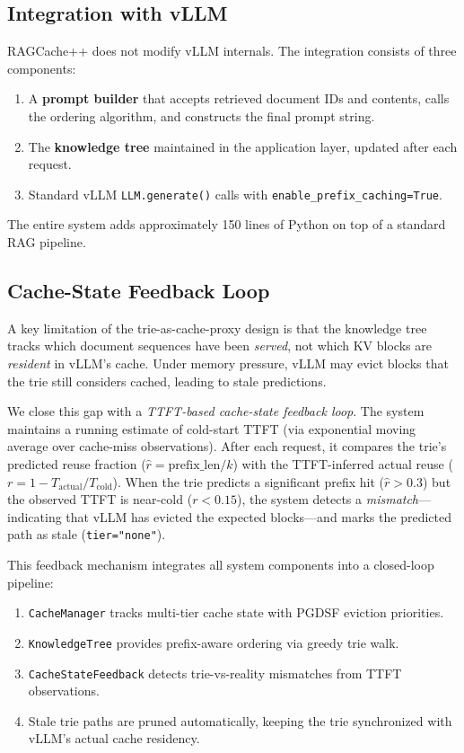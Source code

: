 \documentclass{article}
\begin{document}
\subsection{Integration with vLLM}

RAGCache++ does not modify vLLM internals. The integration consists of three components:
\begin{enumerate}
\item A \textbf{prompt builder} that accepts retrieved document IDs and contents, calls the ordering algorithm, and constructs the final prompt string.
\item The \textbf{knowledge tree} maintained in the application layer, updated after each request.
\item Standard vLLM \texttt{LLM.generate()} calls with \texttt{enable\_prefix\_caching=True}.
\end{enumerate}
The entire system adds approximately 150 lines of Python on top of a standard RAG pipeline.

\subsection{Cache-State Feedback Loop}
\label{sec:feedback}

A key limitation of the trie-as-cache-proxy design is that the knowledge tree tracks which document sequences have been \emph{served}, not which KV blocks are \emph{resident} in vLLM's cache. Under memory pressure, vLLM may evict blocks that the trie still considers cached, leading to stale predictions.

We close this gap with a \emph{TTFT-based cache-state feedback loop}. The system maintains a running estimate of cold-start TTFT (via exponential moving average over cache-miss observations). After each request, it compares the trie's predicted reuse fraction ($\hat{r} = \text{prefix\_len} / k$) with the TTFT-inferred actual reuse ($r = 1 - T_{\text{actual}} / T_{\text{cold}}$). When the trie predicts a significant prefix hit ($\hat{r} > 0.3$) but the observed TTFT is near-cold ($r < 0.15$), the system detects a \emph{mismatch}---indicating that vLLM has evicted the expected blocks---and marks the predicted path as stale (\texttt{tier="none"}).

This feedback mechanism integrates all system components into a closed-loop pipeline:
\begin{enumerate}
\item \texttt{CacheManager} tracks multi-tier cache state with PGDSF eviction priorities.
\item \texttt{KnowledgeTree} provides prefix-aware ordering via greedy trie walk.
\item \texttt{CacheStateFeedback} detects trie-vs-reality mismatches from TTFT observations.
\item Stale trie paths are pruned automatically, keeping the trie synchronized with vLLM's actual cache residency.
\end{enumerate}
\end{document}
